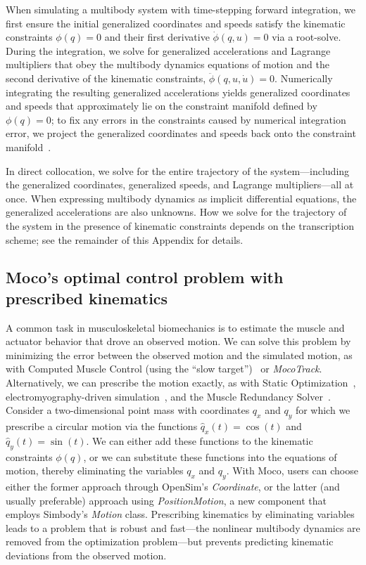 \documentclass[10pt,letterpaper]{article}
\begin{document}
When simulating a multibody system with time-stepping forward integration, we first ensure the initial generalized coordinates and speeds satisfy the kinematic constraints $\phi(q) = 0$ and their first derivative $\dot{\phi}(q, u) = 0$ via a root-solve. During the integration, we solve for generalized accelerations and Lagrange multipliers that obey the multibody dynamics equations of motion and the second derivative of the kinematic constraints, $\ddot{\phi}(q, u, \dot{u}) = 0$. Numerically integrating the resulting generalized accelerations yields generalized coordinates and speeds that approximately lie on the constraint manifold defined by $\phi(q) = 0$; to fix any errors in the constraints caused by numerical integration error, we project the generalized coordinates and speeds back onto the constraint manifold~\cite{Sherman:2011byc}.

In direct collocation, we solve for the entire trajectory of the system—including the generalized coordinates, generalized speeds, and Lagrange multipliers—all at once. When expressing multibody dynamics as implicit differential equations, the generalized accelerations are also unknowns. How we solve for the trajectory of the system in the presence of kinematic constraints depends on the transcription scheme; see the remainder of this Appendix for details.

\subsection*{Moco's optimal control problem with prescribed kinematics}

A common task in musculoskeletal biomechanics is to estimate the muscle and actuator behavior that drove an observed motion. We can solve this problem by minimizing the error between the observed motion and the simulated motion, as with Computed Muscle Control (using the ``slow target'')~\cite{Thelen:2003bba} or \textit{MocoTrack}. Alternatively, we can prescribe the motion exactly, as with Static Optimization~\cite{Crowninshield:1981}, electromyography-driven simulation~\cite{Lloyd:2003}, and the Muscle Redundancy Solver~\cite{Groote:2016dq}. Consider a two-dimensional point mass with coordinates $q_x$ and $q_y$ for which we prescribe a circular motion via the functions $\hat{q}_x(t) = \cos(t)$ and $\hat{q}_y(t) = \sin(t)$. We can either add these functions to the kinematic constraints $\phi(q)$, or we can substitute these functions into the equations of motion, thereby eliminating the variables $q_x$ and $q_y$. With Moco, users can choose either the former approach through OpenSim's \textit{Coordinate}, or the latter (and usually preferable) approach using \textit{PositionMotion}, a new component that employs Simbody's \textit{Motion} class. Prescribing kinematics by eliminating variables leads to a problem that is robust and fast---the nonlinear multibody dynamics are removed from the optimization problem---but prevents predicting kinematic deviations from the observed motion.
\end{document}
